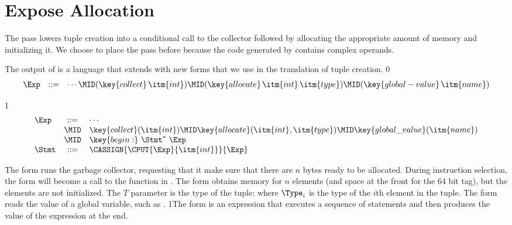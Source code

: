 \documentclass[7x10,nocrop]{TimesAPriori_MIT}%
\def\racketEd{0}
\def\pythonEd{1}
\def\edition{0}
\newcommand{\racket}[1]{{\if\edition\racketEd{#1}\fi}}
\newcommand{\python}[1]{{\if\edition\pythonEd #1\fi}}
\begin{document}
\section{Expose Allocation}
\label{sec:expose-allocation}

The pass  lowers tuple creation into a
conditional call to the collector followed by allocating the
appropriate amount of memory and initializing it.  We choose to place
the  pass before
 because the code generated by
 contains complex operands.

The output of  is a language \LangAlloc{}
that extends \LangVec{} with new forms that we use in the translation
of tuple creation.
%
{\if\edition\racketEd
\[
\begin{array}{lcl}
  \Exp &::=& \cdots
      \MID (\key{collect} \,\itm{int})
      \MID (\key{allocate} \,\itm{int}\,\itm{type})
      \MID (\key{global-value} \,\itm{name}) 
\end{array}
\]
\fi}
{\if\edition\pythonEd
\[
\begin{array}{lcl}
  \Exp &::=& \cdots\\
      &\MID& \key{collect}(\itm{int})
      \MID \key{allocate}(\itm{int},\itm{type})
      \MID \key{global\_value}(\itm{name}) \\
      &\MID& \key{begin:} ~ \Stmt^{*} ~ \Exp \\
   \Stmt &::= & \CASSIGN{\CPUT{\Exp}{\itm{int}}}{\Exp}
\end{array}
\]

\fi}

The  form runs the garbage collector, requesting that it
make sure that there are $n$ bytes ready to be allocated. During
instruction selection, the  form will become a call to
the  function in .
%
The  form obtains memory for $n$ elements (and
space at the front for the 64 bit tag), but the elements are not
initialized.   The $T$ parameter is the type
of the tuple:
%
\VECTY{\racket{$\Type_1 \ldots \Type_n$}\python{$\Type_1, \ldots, \Type_n$}}
%
where $\Type_i$ is the type of the $i$th element in the tuple. The
 form reads the value of a global variable, such
as .
%
\python{The  form is an expression that executes a
  sequence of statements and then produces the value of the expression
  at the end.}
\end{document}
